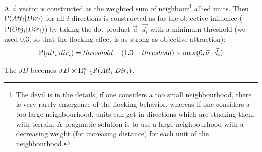 A $\vec{a}$ vector is constructed as the weighted sum of neighbour\footnote{The devil is in the details, if one considers a too small neighbourhood, there is very rarely emergence of the flocking behavior, whereas if one considers a too large neighbourhood, units can get in directions which are stucking them with terrain. A pragmatic solution is to use a large neighbourhood with a decreasing weight (for increasing distance) for each unit of the neighbourhood.} allied units. Then $\mathrm{P}(Att_i|Dir_i)$%
 for all $i$ directions is constructed as for the objective influence ($\mathrm{P}(Obj_i|Dir_i)$) by taking the dot product $\vec{a} \cdot \vec{d_i}$ with a minimum threshold (we used 0.3, so that the flocking effect is as strong as objective attraction):
$$\mathrm{P}(att_i|dir_i) = threshold + (1.0-threshold)\times \mathrm{max}(0, \vec{a} \cdot \vec{d_i})$$

The $JD$ becomes $JD \times \Pi_{i=1}^{n} \mathrm{P}(Att_{i} | Dir_i)$.

